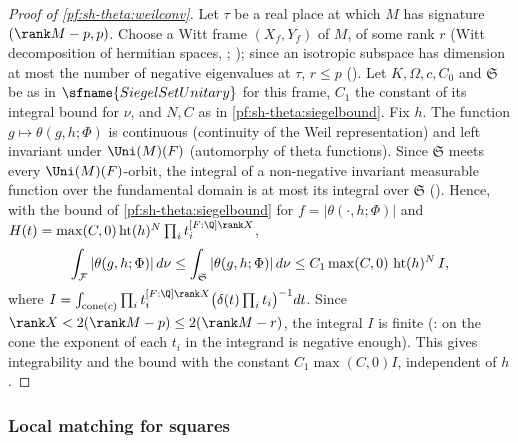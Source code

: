 \begin{proof}[Proof of \cref{pf:sh-theta:weilconv}]
Let $\tau$ be a real place at which $M$ has signature $(\rank M-p,p)$. Choose a Witt frame $(X_f,Y_f)$ of $M$, of some rank
$r$ (Witt decomposition of hermitian spaces, \cite{Scharlau1985}; ); since an isotropic subspace has dimension at most the number of
negative eigenvalues at $\tau$, $r\le p$ (). Let
$K,\Omega,c,C_0$ and $\mathfrak S$ be as in $\sfname{SiegelSetUnitary}$ for this frame, $C_1$ the constant of its integral
bound for $\nu$, and $N,C$ as in \cref{pf:sh-theta:siegelbound}. Fix $h$. The function $g\mapsto\theta(g,h;\Phi)$ is
continuous (continuity of the Weil representation) and left invariant under $\Uni(M)(F)$ (automorphy of theta functions).
Since $\mathfrak S$ meets every $\Uni(M)(F)$-orbit, the integral of a non-negative invariant measurable function over the
fundamental domain is at most its integral over $\mathfrak S$
(). Hence, with the bound of
\cref{pf:sh-theta:siegelbound} for $f=|\theta(\cdot,h;\Phi)|$ and $H(t)=\max(C,0)\shthetaht(h)^N\prod_it_i^{[F:\Q]\rank X}$,
\[
\int_{\mathcal{F}}|\theta(g,h;\Phi)|\,d\nu\le\int_{\mathfrak S}|\theta(g,h;\Phi)|\,d\nu
\le C_1\max(C,0)\,\operatorname{ht}(h)^N\,I,
\]
where $I=\int_{\mathrm{cone}(c)}\prod_it_i^{[F:\Q]\rank X}\bigl(\delta(t)\prod_it_i\bigr)^{-1}dt$.
Since $\rank X<2(\rank M-p)\le2(\rank M-r)$, the integral $I$ is finite
(: on the cone the exponent of each $t_i$ in the
integrand is negative enough). This gives integrability and the bound with the constant $C_1\max(C,0)I$, independent of $h$.
\end{proof}

\subsubsection{Local matching for squares}

